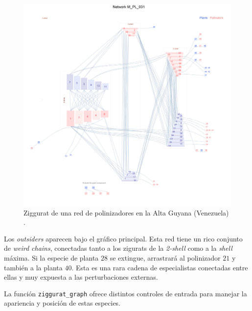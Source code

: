 \clearpage
\begin{figure}[hp!]
\centering
\includegraphics[scale=0.5]{ManFigs/M_PL_031_ziggurat.png}
\caption {Ziggurat de una red de polinizadores en la Alta Guyana (Venezuela) \cite{ramirez1989biologia}.}
\label{fig:AKMAN_ziggurat_031}
\end{figure}

Los \textit{outsiders} aparecen bajo el gráfico principal. Esta red tiene un rico conjunto de \textit{weird chains}, conectadas tanto a los zigurats de la \textit{2-shell} como a la \textit{shell} máxima. Si la especie de planta $28$ se extingue, arrastrará al polinizador $21$ y también a la planta $40$. Esta es una rara cadena de especialistas conectadas entre ellas y muy expuesta a las perturbaciones externas.

La función \texttt{ziggurat\_graph} ofrece distintos controles de entrada para manejar la apariencia y posición de estas especies.

